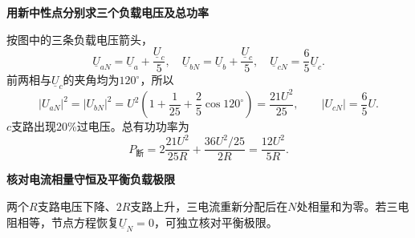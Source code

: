 \begin{solution}
\par\medskip{}\noindent

\par\medskip{}\noindent\textbf{用新中性点分别求三个负载电压及总功率}\par\nobreak
按图中的三条负载电压箭头，
\[
 \underline U_{aN}=\underline U_a+\frac{\underline U_c}{5},\quad
 \underline U_{bN}=\underline U_b+\frac{\underline U_c}{5},\quad
 \underline U_{cN}=\frac65\underline U_c.
\]
前两相与$\underline U_c$的夹角均为$120^\circ$，所以
\[
 |U_{aN}|^2=|U_{bN}|^2
 =U^2\left(1+\frac1{25}+\frac25\cos120^\circ\right)
 =\frac{21U^2}{25},\qquad |U_{cN}|=\frac65U.
\]
$c$支路出现20\%过电压。总有功功率为
\[
 \boxed{P_{\text{断}}
   =2\frac{21U^2}{25R}+\frac{36U^2/25}{2R}
   =\frac{12U^2}{5R}}.
\]


\par\medskip{}\noindent\textbf{核对电流相量守恒及平衡负载极限}\par\nobreak
两个$R$支路电压下降、$2R$支路上升，三电流重新分配后在$N$处相量和为零。若三电阻相等，节点方程恢复$\underline U_N=0$，可独立核对平衡极限。
\end{solution}
